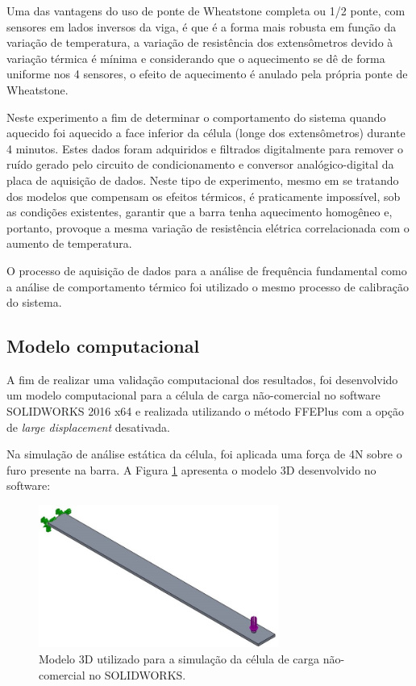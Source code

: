 \documentclass[a4paper]{instrumentacao}
\begin{document}
Uma das vantagens do uso de ponte de Wheatstone completa ou 1/2 ponte, com sensores em lados inversos da viga, é que é a forma mais robusta em função da variação de temperatura, a variação de resistência dos extensômetros devido à variação térmica é mínima e considerando que o aquecimento se dê de forma uniforme nos 4 sensores, o efeito de aquecimento é anulado pela própria ponte de Wheatstone.

Neste experimento a fim de determinar o comportamento do sistema quando aquecido foi aquecido a face inferior da célula (longe dos extensômetros) durante 4 minutos. Estes dados foram adquiridos e filtrados digitalmente para remover o ruído gerado pelo circuito de condicionamento e conversor analógico-digital da placa de aquisição de dados. Neste tipo de experimento, mesmo em se tratando dos modelos que compensam os efeitos térmicos, é praticamente impossível, sob as condições existentes, garantir que a barra tenha aquecimento homogêneo e, portanto, provoque a mesma variação de resistência elétrica correlacionada com o aumento de temperatura. 

O processo de aquisição de dados para a análise de frequência fundamental como a análise de comportamento térmico foi utilizado o mesmo processo de calibração do sistema.

\subsection{Modelo computacional}
A fim de realizar uma validação computacional dos resultados, foi desenvolvido um modelo computacional para a célula de carga não-comercial no software SOLIDWORKS 2016 x64 e realizada utilizando o método FFEPlus com a opção de \textit{large displacement} desativada.

Na simulação de análise estática da célula, foi aplicada uma força de 4N sobre o furo presente na barra. A Figura \ref{fig:celula-nao-comercial-solid-modelo} apresenta o modelo 3D desenvolvido no software:

\begin{figure}[H]
\center
\includegraphics[width=0.7\textwidth]{CelulaNaoComercial_solid.jpg}
\caption{Modelo 3D utilizado para a simulação da célula de carga não-comercial no SOLIDWORKS.}
\label{fig:celula-nao-comercial-solid-modelo}
\end{figure}
\end{document}
